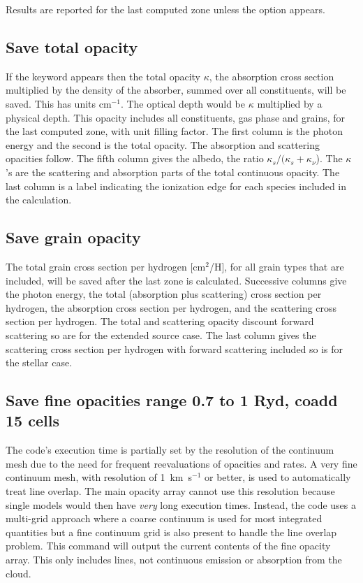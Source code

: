 Results are reported for the last computed zone unless the  option
appears.

\subsection{Save total opacity}

If the keyword  appears then the total opacity $\kappa$,
the absorption
cross section multiplied by the density of the absorber, summed over all
constituents, will be saved.
This has units cm$^{-1}$.
The optical depth would
be $\kappa $ multiplied by a physical depth.  This opacity includes all constituents,
gas phase and grains, for the last computed zone, with unit filling factor.
The first column is the photon energy and the second is the total opacity.
The absorption and scattering opacities follow.  The fifth column gives
the albedo, the ratio $\kappa _s /( {\kappa _s  + \kappa _\nu  }$).   The
$\kappa $'s are the scattering and absorption parts of the total continuous
opacity.  The last column is a label indicating the ionization edge for
each species included in the calculation.

\subsection{Save grain opacity}

The total grain cross section per hydrogen [cm$^2$/H],
for all grain types that are included, will be
saved after the last zone is calculated.  Successive columns give the
photon energy, the total (absorption plus scattering) cross section per hydrogen, 
the absorption cross section per hydrogen, and the scattering cross section per hydrogen.  The total and scattering opacity
discount forward scattering so are for the extended source case.  The last
column gives the scattering cross section per hydrogen with forward scattering included so
is for the stellar case.

\subsection{Save fine opacities range 0.7 to 1 Ryd, coadd 15 cells}

The code's execution time is partially set by the resolution of the
continuum mesh due to the need for frequent reevaluations of opacities and
rates.
A very fine continuum mesh, with resolution of 1~km~s$^{-1}$ or better,
is used to automatically treat line overlap.
The main opacity array cannot
use this resolution because single models would then have \emph{very} long execution
times.
Instead, the code uses a multi-grid approach where a coarse continuum
is used for most integrated quantities but a fine continuum grid is also
present to handle the line overlap problem.  This command will output the
current contents of the fine opacity array.  This only includes lines, not
continuous
emission or absorption from the cloud.

